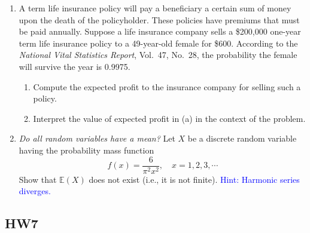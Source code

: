 \documentclass[12pt]{article}
\begin{document}
\begin{enumerate}
  \item A term life insurance policy will pay a beneficiary a certain sum of money upon the death of the policyholder. These policies have premiums that must be paid annually. Suppose a life insurance company sells a \$200,000 one-year term life insurance policy to a 49-year-old female for \$600. According to the \textit{National Vital Statistics Report}, Vol.~47, No.~28, the probability the female will survive the year is 0.9975.
    \begin{enumerate}[label=(\alph*)]
      \item Compute the expected profit to the insurance company for selling such a policy.
      \item Interpret the value of expected profit in (a) in the context of the problem.
    \end{enumerate}

\newpage

  \item \textit{Do all random variables have a mean?} Let $X$ be a discrete random variable having the probability mass function
    \[
      f(x) = \frac{6}{\pi^2 x^2}, \quad x = 1, 2, 3, \cdots
    \]
    Show that $\mathbb{E}(X)$ does not exist (i.e., it is not finite). \hfill \textcolor{blue}{Hint: Harmonic series diverges.}

\newpage

\end{enumerate}

\subsection*{HW7}
\end{document}
